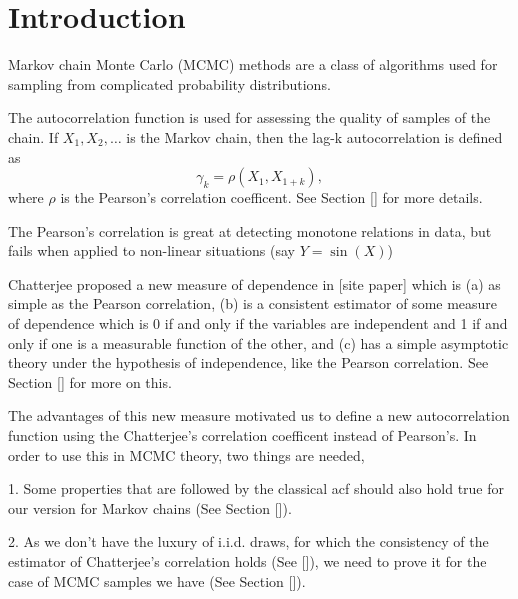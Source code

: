 \chapter{Introduction}

Markov chain Monte Carlo (MCMC) methods are a class of algorithms used for sampling from complicated probability distributions.

The autocorrelation function is used for assessing the quality of samples of the chain. If $X_1, X_2, \dots$ is the Markov chain,
then the lag-k autocorrelation is defined as
$$\gamma_k = \rho(X_1, X_{1+k}),$$
where $\rho$ is the Pearson's correlation coefficent. See Section [] for more details.

The Pearson's correlation is great at detecting monotone relations in data,
but fails when applied to non-linear situations (say $Y = \sin(X)$)

Chatterjee proposed a new measure of dependence in [site paper] which is
(a) as simple as the Pearson correlation,
(b) is a consistent estimator of some measure of dependence which is 0 if and only if the variables are independent and 1 if and only if one is a measurable function of the other, and
(c) has a simple asymptotic theory under the hypothesis of independence, like the Pearson correlation.
See Section [] for more on this.

The advantages of this new measure motivated us to define a new autocorrelation function using the Chatterjee's correlation coefficent instead of Pearson's.
In order to use this in MCMC theory, two things are needed,

1. Some properties that are followed by the classical acf should also hold true for our version for Markov chains (See Section []).

2. As we don't have the luxury of i.i.d. draws, for which the consistency of the estimator of Chatterjee's correlation holds (See []),
	we need to prove it for the case of MCMC samples we have (See Section []).